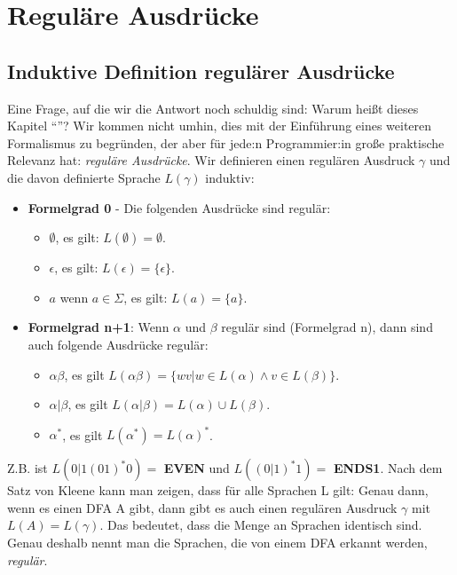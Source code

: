 \section{Reguläre Ausdrücke}\label{regex}

\subsection{Induktive Definition regulärer Ausdrücke}
Eine Frage, auf die wir die Antwort noch schuldig sind:
Warum heißt dieses Kapitel ``''?
Wir kommen nicht umhin, dies mit der Einführung eines weiteren Formalismus zu begründen,
der aber für jede:n Programmier:in große praktische Relevanz hat:
\emph{reguläre Ausdrücke}.
Wir definieren einen regulären Ausdruck $\gamma$
und die davon definierte Sprache $L(\gamma)$ induktiv:
\begin{itemize}
    \item \textbf{Formelgrad 0} - Die folgenden Ausdrücke sind regulär:
        \begin{itemize}
            \item $\emptyset$, es gilt: $L(\emptyset) = \emptyset$.
            \item $\epsilon$,  es gilt: $L(\epsilon) = \{\epsilon\}$.
            \item $a$ wenn $a \in \Sigma$, es gilt: $L(a) = \{a\}$.
        \end{itemize}
    \item \textbf{Formelgrad n+1}: Wenn $\alpha$  und $\beta$ regulär sind (Formelgrad n),
        dann sind auch folgende Ausdrücke regulär:
        \begin{itemize}
            \item $\alpha\beta$,
                es gilt $L(\alpha\beta) = \{wv| w \in L(\alpha) \wedge v \in L(\beta)\}$.
            \item $\alpha|\beta$,
                es gilt $L(\alpha|\beta) = L(\alpha) \cup L(\beta)$. 
            \item $\alpha^*$,
                es gilt $L(\alpha^*) = L(\alpha)^*$.
        \end{itemize}
\end{itemize}

Z.B. ist $L(0|1(01)^*0) =$ \textbf{EVEN} und $L((0|1)^*1) =$ \textbf{ENDS1}.
Nach dem Satz von Kleene kann man zeigen, dass für alle Sprachen L gilt:
Genau dann, wenn es einen DFA A gibt, dann gibt es auch einen regulären Ausdruck $\gamma$
mit $L(A) = L(\gamma)$.
Das bedeutet, dass die Menge an Sprachen identisch sind.
Genau deshalb nennt man die Sprachen, die von einem DFA erkannt werden, \emph{regulär}.

